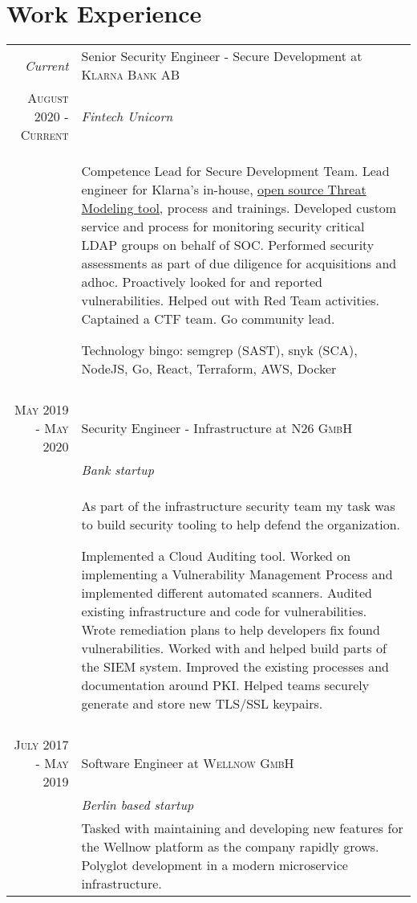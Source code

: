 \documentclass[a4paper,10pt]{article}
\begin{document}
\section{Work Experience}
\begin{tabular}{r|p{11cm}}

 \emph{Current} & Senior Security Engineer - Secure Development at \textsc{Klarna Bank AB}\\
 \textsc{August 2020 - Current} & \emph{Fintech Unicorn}\\
 &\footnotesize{
    Competence Lead for Secure Development Team. 
    Lead engineer for Klarna's in-house, \href{https://github.com/klarna-incubator/gram}{open source Threat Modeling tool}, process and trainings.  
    Developed custom service and process for monitoring security critical LDAP groups on behalf of SOC.
    Performed security assessments as part of due diligence for acquisitions and adhoc. 
    Proactively looked for and reported vulnerabilities. Helped out with Red Team activities.     
    Captained a CTF team. Go community lead. 



    Technology bingo: semgrep (SAST), snyk (SCA), NodeJS, Go, React, Terraform, AWS, Docker
 }\\ \multicolumn{2}{c}{} \\
    
  \textsc{May 2019 - May 2020} & Security Engineer - Infrastructure at \textsc{N26 GmbH}\\
 &\emph{Bank startup}\\
 &\footnotesize{     
 As part of the infrastructure security team my task was to build security tooling to help defend the organization. 
 
 Implemented a Cloud Auditing tool.
 Worked on implementing a Vulnerability Management Process and implemented different automated scanners.
 Audited existing infrastructure and code for vulnerabilities. Wrote remediation plans to help developers fix found vulnerabilities.
 Worked with and helped build parts of the SIEM system.
 Improved the existing processes and documentation around PKI. Helped teams securely generate and store new TLS/SSL keypairs.
 }\\ \multicolumn{2}{c}{} \\

 \textsc{July 2017 - May 2019} & Software Engineer at \textsc{Wellnow GmbH}\\ 
 &\emph{Berlin based startup}\\
 &\footnotesize{
 Tasked with maintaining and developing new features for the Wellnow platform as the company rapidly grows. 
 Polyglot development in a modern microservice infrastructure. 

}
\end{tabular}
\end{document}
